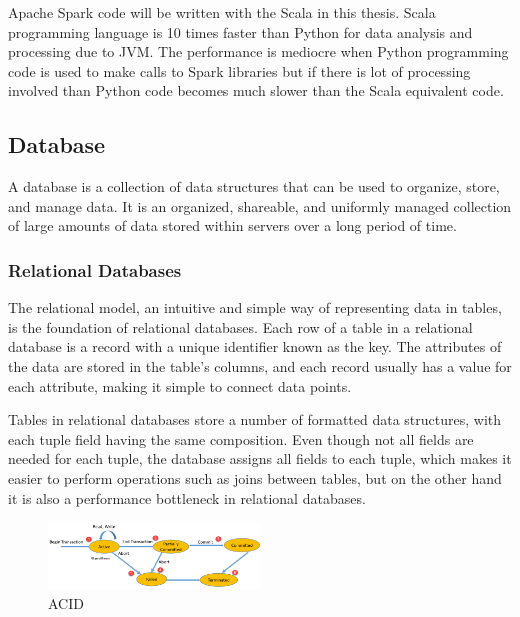 Apache Spark code will be written with the Scala in this thesis. Scala programming language is 10 times faster than Python for data analysis and processing due to JVM. The performance is mediocre when Python programming code is used to make calls to Spark libraries but if there is lot of processing involved than Python code becomes much slower than the Scala equivalent code\cite{9315863}.

\subsection{Database}
A database is a collection of data structures that can be used to organize, store, and manage data. It is an organized, shareable, and uniformly managed collection of large amounts of data stored within servers over a long period of time\cite{wikipedia_database}.

\subsubsection{Relational Databases}

The relational model, an intuitive and simple way of representing data in tables, is the foundation of relational databases. Each row of a table in a relational database is a record with a unique identifier known as the key. The attributes of the data are stored in the table's columns, and each record usually has a value for each attribute, making it simple to connect data points.

Tables in relational databases store a number of formatted data structures, with each tuple field having the same composition. Even though not all fields are needed for each tuple, the database assigns all fields to each tuple, which makes it easier to perform operations such as joins between tables, but on the other hand it is also a performance bottleneck in relational databases.

\begin{figure}[hbt!]
	\centering
 	\includegraphics[width=0.5\textwidth]{gfx/DBMSTransac.png}  	  	 	
	\caption{ACID\cite{peterson_2021}}
	\label{fig:acid}
\end{figure}

